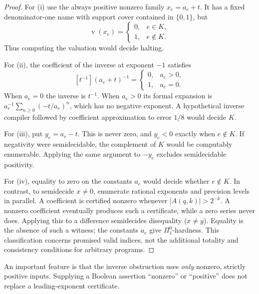 \documentclass[11pt,letterpaper]{article}
\numberwithin{equation}{section}
\theoremstyle{definition}
\theoremstyle{remark}
\newcommand{\val}{\operatorname{v}}
\newcommand{\coef}[2]{[t^{#1}]#2}
\begin{document}
\begin{proof}
For (i) use the always positive nonzero family
$x_e=a_e+t$. It has a fixed denominator-one name with support cover
contained in $\{0,1\}$, but
\[
 \val(x_e)=\begin{cases}0,&e\in K,\\1,&e\notin K.\end{cases}
\]
Thus computing the valuation would decide halting.

For (ii), the coefficient of the inverse at exponent $-1$ satisfies
\begin{equation}\label{eq:inversehalting}
 \coef{-1}{(a_e+t)^{-1}}=
 \begin{cases}0,&a_e>0,\\1,&a_e=0.\end{cases}
\end{equation}
When $a_e=0$ the inverse is $t^{-1}$. When $a_e>0$ its formal expansion
is $a_e^{-1}\sum_{n\ge0}(-t/a_e)^n$, which has no negative exponent.
A hypothetical inverse compiler followed by coefficient approximation to
error $1/8$ would decide $K$.

For (iii), put $y_e=a_e-t$. This is never zero, and
$y_e<0$ exactly when $e\notin K$. If negativity were semidecidable, the
complement of $K$ would be computably enumerable. Applying the same
argument to $-y_e$ excludes semidecidable positivity.

For (iv), equality to zero on the constants $a_e$ would decide whether
$e\notin K$. In contrast, to semidecide $x\ne0$, enumerate rational
exponents and precision levels in parallel. A coefficient is certified
nonzero whenever $|A(q,k)|>2^{-k}$. A nonzero coefficient eventually
produces such a certificate, while a zero series never does. Applying this to a difference semidecides
disequality ($x\ne y$). Equality is the absence of such a witness; the constants $a_e$
give $\Pi^0_1$-hardness. This classification concerns promised valid indices,
not the additional totality and consistency conditions for arbitrary programs.
\end{proof}

An important feature is that the inverse obstruction uses \emph{only}
nonzero, strictly positive inputs. Supplying a Boolean assertion
``nonzero'' or ``positive'' does not replace a leading-exponent certificate.
\end{document}
